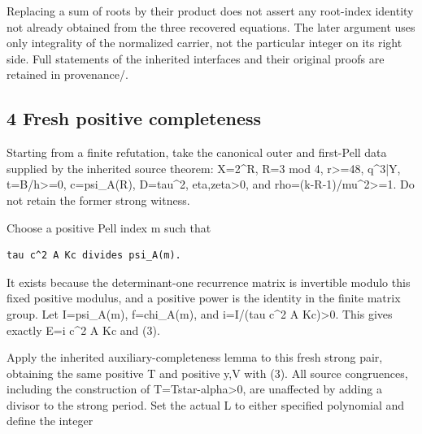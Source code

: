 Replacing a sum of roots by their product does not assert any root-index identity not already obtained from the three recovered equations. The later argument uses only integrality of the normalized carrier, not the particular integer on its right side. Full statements of the inherited interfaces and their original proofs are retained in provenance/.



\subsection{4 Fresh positive completeness}



Starting from a finite refutation, take the canonical outer and first-Pell data supplied by the inherited source theorem: X=\allowbreak{}2\textasciicircum{}\allowbreak{}R, R=\allowbreak{}3 mod 4, r\textgreater{}\allowbreak{}=\allowbreak{}48, q\textasciicircum{}\allowbreak{}3|Y, t=\allowbreak{}B/\allowbreak{}h\textgreater{}\allowbreak{}=\allowbreak{}0, c=\allowbreak{}psi\_\allowbreak{}A(R), D=\allowbreak{}tau\textasciicircum{}\allowbreak{}2, eta,zeta\textgreater{}\allowbreak{}0, and rho=\allowbreak{}(k-R-1)/\allowbreak{}mu\textasciicircum{}\allowbreak{}2\textgreater{}\allowbreak{}=\allowbreak{}1. Do not retain the former strong witness.



Choose a positive Pell index m such that



\begin{verbatim}
tau c^2 A Kc divides psi_A(m).
\end{verbatim}

It exists because the determinant-one recurrence matrix is invertible modulo this fixed positive modulus, and a positive power is the identity in the finite matrix group. Let I=\allowbreak{}psi\_\allowbreak{}A(m), f=\allowbreak{}chi\_\allowbreak{}A(m), and i=\allowbreak{}I/\allowbreak{}(tau c\textasciicircum{}\allowbreak{}2 A Kc)\textgreater{}\allowbreak{}0. This gives exactly E=\allowbreak{}i c\textasciicircum{}\allowbreak{}2 A Kc and (3).



Apply the inherited auxiliary-completeness lemma to this fresh strong pair, obtaining the same positive T and positive y,V with (3). All source congruences, including the construction of T=\allowbreak{}Tstar-alpha\textgreater{}\allowbreak{}0, are unaffected by adding a divisor to the strong period. Set the actual L to either specified polynomial and define the integer



